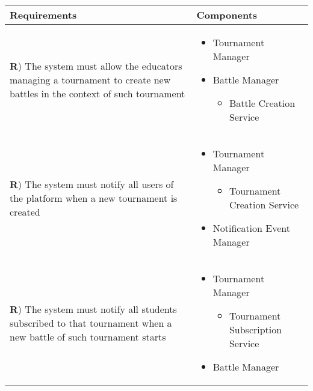 \documentclass[../DD.tex]{subfiles}
\newcounter{rown}
\newcommand{\rowIndex}{\arabic{rown}\stepcounter{rown}}
\begin{document}
    \begin{table}[h!]
        \begin{center}
            \hspace*{-2cm}
            \begin{tabular}{|m{20em}|m{20em}|}
            \hline
            \textbf{Requirements} & \textbf{Components}\\
            \hline
            \textbf{R\rowIndex}) The system must allow the educators managing a tournament to create new battles in the context of such tournament & \begin{itemize}
                \item Tournament Manager
                \item Battle Manager
                \begin{itemize}
                    \item Battle Creation Service
                \end{itemize}
            \end{itemize}\\
            \hline
            \textbf{R\rowIndex}) The system must notify all users of the platform when a new tournament is created & \begin{itemize}
                \item Tournament Manager
                \begin{itemize}
                    \item Tournament Creation Service
                \end{itemize}
                \item Notification Event Manager
            \end{itemize}\\
            \hline
            \textbf{R\rowIndex}) The system must notify all students subscribed to that tournament when a new battle of such tournament starts & \begin{itemize}
                \item Tournament Manager
                \begin{itemize}
                    \item Tournament Subscription Service
                \end{itemize}
                \item Battle Manager
                \begin{itemize}

\end{itemize}
\end{itemize}
\end{tabular}
\end{center}
\end{table}
\end{document}
